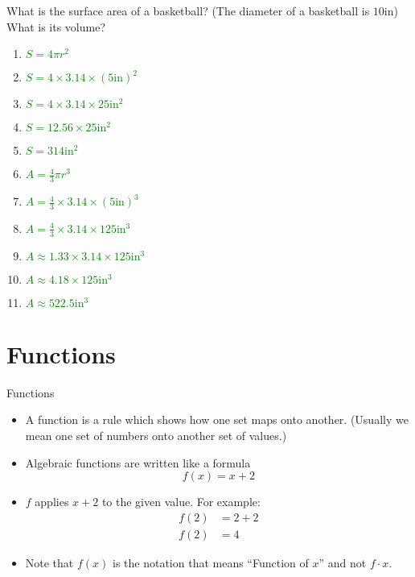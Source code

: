 \documentclass{beamer}
\begin{document}
\begin{frame}
    What is the surface area of a basketball? (The diameter of
        a basketball is $10\mathrm{in}$) What is its volume?
    \begin{enumerate}[<+(1)->]
        \item \textcolor{green}{$S=4\pi r^2$}
        \item \textcolor{green}{$S=4 \times 3.14 \times (5\mathrm{in})^2$}
        \item \textcolor{green}{$S=4 \times 3.14 \times 25\mathrm{in^2}$}
        \item \textcolor{green}{$S=12.56 \times 25\mathrm{in^2}$}
        \item \textcolor{green}{$S=314\mathrm{in^2}$}
        \item \textcolor{green}{$A=\frac{4}{3} \pi r^3$}
        \item \textcolor{green}{$A=\frac{4}{3} \times 3.14 \times (5\mathrm{in})^3$}
        \item \textcolor{green}{$A=\frac{4}{3} \times 3.14 \times 125\mathrm{in^3}$}
        \item \textcolor{green}{$A\approx 1.33 \times 3.14 \times 125\mathrm{in^3}$}
        \item \textcolor{green}{$A\approx 4.18 \times 125\mathrm{in^3}$}
        \item \textcolor{green}{$A\approx 522.5\mathrm{in^3}$}
    \end{enumerate}
\end{frame}

\section{Functions}
\begin{frame}{Functions}
\begin{itemize}[<+->]
    \item A function is a rule which shows how one set maps onto
        another.  (Usually we mean one set of numbers onto another set of
        values.)
    \item Algebraic functions are written like a formula\newline
    \[
        f(x) = x + 2
    \]
    \item $f$ applies $x+2$ to the given value.  For example:
        \begin{align*}
        f(2) &= 2 + 2 \\
        f(2) &= 4
        \end{align*}
    \item Note that $f(x)$ is the notation that means ``Function of $x$'' and not $f \cdot x$.
    \end{itemize}
\end{frame}
\end{document}
